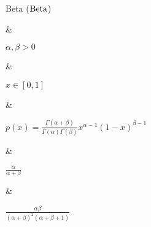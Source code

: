 Beta ($\operatorname{Beta}$)

&

$\alpha, \beta > 0$

&

$x \in [0, 1]$

&

\(\displaystyle
	p(x) = \frac{\Gamma(\alpha + \beta)}{\Gamma(\alpha)\Gamma(\beta)} x^{\alpha - 1} (1 - x)^{\beta - 1}
\)

&

$\frac{\alpha}{\alpha + \beta}$

&

$\frac{\alpha\beta}{(\alpha + \beta)^2(\alpha + \beta + 1)}$